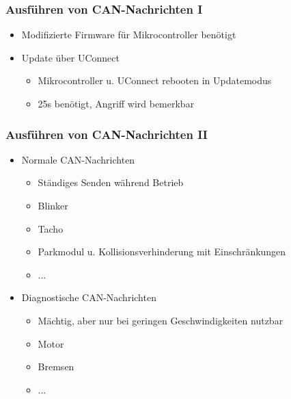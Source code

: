 \documentclass[t]{beamer}
\begin{document}
\begin{frame}
	\frametitle{Ausführen von CAN-Nachrichten I}
    \begin{itemize}
    	\item Modifizierte Firmware für Mikrocontroller benötigt
    \end{itemize}
    \begin{itemize}
        \item Update über UConnect
        \begin{itemize}
        	\item Mikrocontroller u. UConnect rebooten in Updatemodus
            \item 25s benötigt, Angriff wird bemerkbar
        \end{itemize}
    \end{itemize}
\end{frame}

\begin{frame}
	\frametitle{Ausführen von CAN-Nachrichten II}
	\begin{itemize}
		\item Normale CAN-Nachrichten
        	\begin{itemize}
            	\item Ständiges Senden während Betrieb
                \item Blinker
                \item Tacho
                \item Parkmodul u. Kollisionsverhinderung mit Einschränkungen
                \item ...
            \end{itemize}
        \item Diagnostische CAN-Nachrichten
        	\begin{itemize}
            	\item Mächtig, aber nur bei geringen Geschwindigkeiten nutzbar
            	\item Motor
                \item Bremsen
                \item ...
            \end{itemize}
	\end{itemize}
\end{frame}
\end{document}
